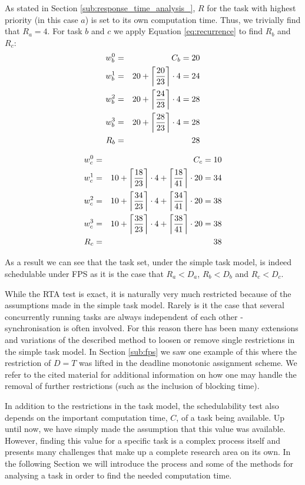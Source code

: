 As stated in Section \ref{sub:response_time_analysis_}, $R$ for the task with highest priority (in this case $a$) is set to its own computation time. Thus, we trivially find that $R_a = 4$. For task $b$ and $c$ we apply Equation \ref{eq:recurrence} to find $R_b$ and $R_c$:
\begin{eqnarray}
    w_{b}^0 &=& C_{b} = 20 \nonumber \\ 
    w_{b}^1 &=& 20 + \ceil[\bigg]{\frac{20}{23}} \cdot 4 = 24 \nonumber \\ 
    w_{b}^2 &=& 20 + \ceil[\bigg]{\frac{24}{23}} \cdot 4 = 28 \nonumber \\
    w_{b}^3 &=& 20 + \ceil[\bigg]{\frac{28}{23}} \cdot 4 = 28 \nonumber \\
    R_{b} &=& 28
\end{eqnarray}

\begin{eqnarray}
    w_{c}^0 &=& C_{c} = 10 \nonumber \\ 
    w_{c}^1 &=& 10 + \ceil[\bigg]{\frac{18}{23}} \cdot 4 + \ceil[\bigg]{\frac{18}{41}} \cdot 20 = 34 \nonumber \\ 
    w_{c}^2 &=& 10 + \ceil[\bigg]{\frac{34}{23}} \cdot 4 + \ceil[\bigg]{\frac{34}{41}} \cdot 20 = 38 \nonumber \\ 
    w_{c}^3 &=& 10 + \ceil[\bigg]{\frac{38}{23}} \cdot 4 + \ceil[\bigg]{\frac{38}{41}} \cdot 20 = 38 \nonumber \\ 
    R_{c} &=& 38
\end{eqnarray}

As a result we can see that the task set, under the simple task model, is indeed schedulable under FPS as it is the case that $R_{a} < D_{a}$, $R_{b} < D_{b}$ and $R_{c} < D_{c}$.

While the RTA test is exact, it is naturally very much restricted because of the assumptions made in the simple task model. Rarely is it the case that several concurrently running tasks are always independent of each other - synchronisation is often involved. For this reason there has been many extensions and variations of the described method to loosen or remove single restrictions in the simple task model. In Section \ref{sub:fps} we saw one example of this where the restriction of $D = T$ was lifted in the deadline monotonic assignment scheme. We refer to the cited material for additional information on how one may handle the removal of further restrictions (such as the inclusion of blocking time).

In addition to the restrictions in the task model, the schedulability test also depends on the important computation time, $C$, of a task being available. Up until now, we have simply made the assumption that this value was available. However, finding this value for a specific task is a complex process itself and presents many challenges that make up a complete research area on its own. In the following Section we will introduce the process and some of the methods for analysing a task in order to find the needed computation time.


